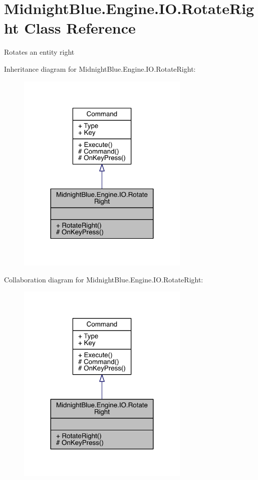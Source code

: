 \hypertarget{class_midnight_blue_1_1_engine_1_1_i_o_1_1_rotate_right}{}\section{Midnight\+Blue.\+Engine.\+I\+O.\+Rotate\+Right Class Reference}
\label{class_midnight_blue_1_1_engine_1_1_i_o_1_1_rotate_right}


Rotates an entity right  




Inheritance diagram for Midnight\+Blue.\+Engine.\+I\+O.\+Rotate\+Right\+:
\nopagebreak
\begin{figure}[H]
\begin{center}
\leavevmode
\includegraphics[width=233pt]{class_midnight_blue_1_1_engine_1_1_i_o_1_1_rotate_right__inherit__graph}
\end{center}
\end{figure}


Collaboration diagram for Midnight\+Blue.\+Engine.\+I\+O.\+Rotate\+Right\+:
\nopagebreak
\begin{figure}[H]
\begin{center}
\leavevmode
\includegraphics[width=233pt]{class_midnight_blue_1_1_engine_1_1_i_o_1_1_rotate_right__coll__graph}
\end{center}
\end{figure}
